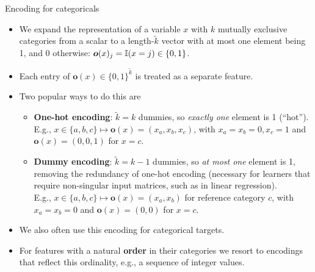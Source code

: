 \documentclass[11pt,compress,t,notes=noshow, xcolor=table]{beamer}
\begin{document}
\begin{vbframe}{Encoding for categoricals}

\begin{itemize}
  \small
  \item We expand the representation of a variable $x$
  with $k$ mutually exclusive categories from a scalar 
  to a length-$\tilde k$ vector with at most one 
  element being 1, and 0 otherwise: $\bm{o}(x)_j =\mathbb{I}(x = j) \in \{0,1\}$.
  \item Each entry of $\bm{o}(x)\in \{0,1\}^{\tilde k}$ is treated as a separate feature.
  \item Two popular ways to do this are
  \begin{itemize}
    \footnotesize
    \item \textbf{One-hot encoding}: $\tilde k = k$ dummies, so \textit{exactly 
    one} element is 1 (\enquote{hot}).
    E.g., $x \in \{ a, b, c\} \mapsto \bm{o}(x) = (x_a, x_b, x_c)$, with 
    $x_a = x_b = 0, x_c = 1$ and $\bm{o}(x) = (0, 0, 1)$ for $x = c$.
    \item \textbf{Dummy encoding}: $\tilde k = k - 1$ dummies, so 
    \textit{at most one} element is 1, removing the redundancy of one-hot 
    encoding (necessary for learners that require non-singular input matrices, 
    such as in linear regression). \\
    E.g., $x \in \{ a, b, c\} \mapsto \bm{o}(x) = (x_a, x_b)$ for reference 
    category $c$, with $x_a = x_b = 0$ and $\bm{o}(x) = (0, 0)$ for $x = c$.
  \end{itemize} 
  \item We also often use this encoding for categorical targets.
  \item For features with a natural \textbf{order} in their categories we 
  resort to encodings that reflect this ordinality, e.g., a sequence 
  of integer values.
\end{itemize}

\end{vbframe}

\end{document}
